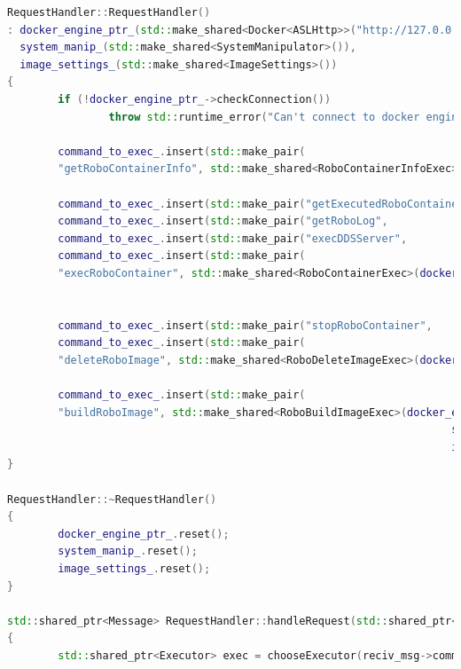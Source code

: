 \documentclass[a4paper, 14pt]{extreport}
\begin{document}
\begin{lstlisting}[language=C++, frame=single, xleftmargin=15pt, caption={Определение методов класса RequestHandler},label=DescriptiveLabel]
RequestHandler::RequestHandler()
: docker_engine_ptr_(std::make_shared<Docker<ASLHttp>>("http://127.0.0.1:2375")),
  system_manip_(std::make_shared<SystemManipulator>()),
  image_settings_(std::make_shared<ImageSettings>())
{
        if (!docker_engine_ptr_->checkConnection())
                throw std::runtime_error("Can't connect to docker engine web api on server!");

        command_to_exec_.insert(std::make_pair(
        "getRoboContainerInfo", std::make_shared<RoboContainerInfoExec>(docker_engine_ptr_,
                                                                               system_manip_)));
        command_to_exec_.insert(std::make_pair("getExecutedRoboContainer", std::make_shared<RoboStartedContainerInfoExec>(docker_engine_ptr_)));
        command_to_exec_.insert(std::make_pair("getRoboLog",               std::make_shared<RoboContainerLogExec>(docker_engine_ptr_)));
        command_to_exec_.insert(std::make_pair("execDDSServer",            std::make_shared<RoboStartDDSExec>(docker_engine_ptr_)));
        command_to_exec_.insert(std::make_pair(
        "execRoboContainer", std::make_shared<RoboContainerExec>(docker_engine_ptr_,
                                                                       system_manip_,
                                                                       image_settings_)));
        command_to_exec_.insert(std::make_pair("stopRoboContainer",        std::make_shared<RoboStopContainerExec>(docker_engine_ptr_)));
        command_to_exec_.insert(std::make_pair(
        "deleteRoboImage", std::make_shared<RoboDeleteImageExec>(docker_engine_ptr_,
                                                                       image_settings_)));
        command_to_exec_.insert(std::make_pair(
        "buildRoboImage", std::make_shared<RoboBuildImageExec>(docker_engine_ptr_,
                                                                      system_manip_,
                                                                      image_settings_)));
}

RequestHandler::~RequestHandler()
{
        docker_engine_ptr_.reset();
        system_manip_.reset();
        image_settings_.reset();
}

std::shared_ptr<Message> RequestHandler::handleRequest(std::shared_ptr<Message> reciv_msg)
{
        std::shared_ptr<Executor> exec = chooseExecutor(reciv_msg->command);


\end{lstlisting}
\end{document}
